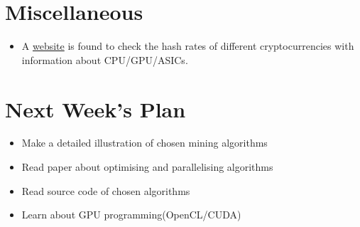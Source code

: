 \documentclass[11pt]{article}
\begin{document}
\section{Miscellaneous}

\begin{itemize}
\item A \href{https://whattomine.com}{website} is found to check the hash rates of different cryptocurrencies with information about CPU/GPU/ASICs.

\end{itemize}

%
%
\section{Next Week's Plan}
\begin{itemize}
\item Make a detailed illustration of chosen mining algorithms
\item Read paper about optimising and parallelising algorithms
\item Read source code of chosen algorithms
\item Learn about GPU programming(OpenCL/CUDA)
\end{itemize}



\end{document}
